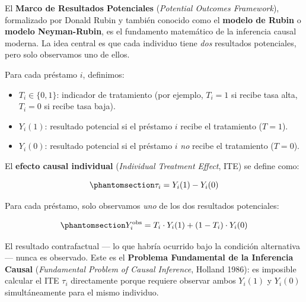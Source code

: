 \documentclass[
  spanish,
  11pt,
  letterpaper,
]{scrbook}
\providecommand{\tightlist}{%
  \setlength{\itemsep}{0pt}\setlength{\parskip}{0pt}}
\theoremstyle{plain}
\theoremstyle{remark}
\begin{document}
El \textbf{Marco de Resultados Potenciales} (\emph{Potential Outcomes
Framework}), formalizado por Donald Rubin y también conocido como el
\textbf{modelo de Rubin} o \textbf{modelo Neyman-Rubin}, es el
fundamento matemático de la inferencia causal moderna. La idea central
es que cada individuo tiene \emph{dos} resultados potenciales, pero solo
observamos uno de ellos.

Para cada préstamo \(i\), definimos:

\begin{itemize}
\tightlist
\item
  \(T_i \in \{0, 1\}\): indicador de tratamiento (por ejemplo,
  \(T_i = 1\) si recibe tasa alta, \(T_i = 0\) si recibe tasa baja).
\item
  \(Y_i(1)\): resultado potencial si el préstamo \(i\) recibe el
  tratamiento (\(T = 1\)).
\item
  \(Y_i(0)\): resultado potencial si el préstamo \(i\) \emph{no} recibe
  el tratamiento (\(T = 0\)).
\end{itemize}

El \textbf{efecto causal individual} (\emph{Individual Treatment
Effect}, ITE) se define como:

\begin{equation}\protect\phantomsection\label{eq-ite}{
\tau_i = Y_i(1) - Y_i(0)
}\end{equation}

\begin{tcolorbox}[enhanced jigsaw, arc=.35mm, bottomrule=.15mm, bottomtitle=1mm, breakable, colback=white, colbacktitle=quarto-callout-note-color!10!white, colframe=quarto-callout-note-color-frame, coltitle=black, left=2mm, leftrule=.75mm, opacityback=0, opacitybacktitle=0.6, rightrule=.15mm, title=\textcolor{quarto-callout-note-color}{\faInfo}\hspace{0.5em}{El Problema Fundamental de la Inferencia Causal}, titlerule=0mm, toprule=.15mm, toptitle=1mm]

Para cada préstamo, solo observamos \emph{uno} de los dos resultados
potenciales:

\begin{equation}\protect\phantomsection\label{eq-observed-outcome}{
Y_i^{\text{obs}} = T_i \cdot Y_i(1) + (1 - T_i) \cdot Y_i(0)
}\end{equation}

El resultado contrafactual --- lo que habría ocurrido bajo la condición
alternativa --- nunca es observado. Este es el \textbf{Problema
Fundamental de la Inferencia Causal} (\emph{Fundamental Problem of
Causal Inference}, Holland 1986): es imposible calcular el ITE
\(\tau_i\) directamente porque requiere observar ambos \(Y_i(1)\) y
\(Y_i(0)\) simultáneamente para el mismo individuo.

\end{tcolorbox}
\end{document}
